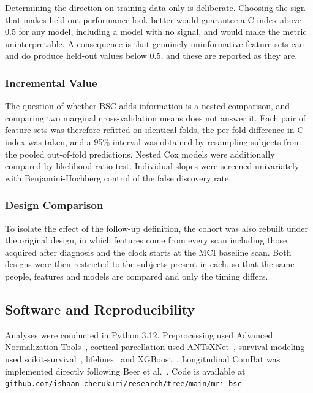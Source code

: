 \documentclass[blue]{ludusofficial}  %
\begin{document}
Determining the direction on training data only is deliberate. Choosing the sign that makes held-out performance look better would guarantee a C-index above 0.5 for any model, including a model with no signal, and would make the metric uninterpretable. A consequence is that genuinely uninformative feature sets can and do produce held-out values below 0.5, and these are reported as they are.

\subsubsection{Incremental Value}

The question of whether BSC adds information is a nested comparison, and comparing two marginal cross-validation means does not answer it. Each pair of feature sets was therefore refitted on identical folds, the per-fold difference in C-index was taken, and a 95\% interval was obtained by resampling subjects from the pooled out-of-fold predictions. Nested Cox models were additionally compared by likelihood ratio test. Individual slopes were screened univariately with Benjamini-Hochberg control of the false discovery rate.

\subsubsection{Design Comparison}

To isolate the effect of the follow-up definition, the cohort was also rebuilt under the original design, in which features come from every scan including those acquired after diagnosis and the clock starts at the MCI baseline scan. Both designs were then restricted to the subjects present in each, so that the same people, features and models are compared and only the timing differs.

\subsection{Software and Reproducibility}

Analyses were conducted in Python 3.12. Preprocessing used Advanced Normalization Tools~\cite{avants2011ants}, cortical parcellation used ANTsXNet~\cite{tustison2021antsxnet}, survival modeling used scikit-survival~\cite{polsterl2020sksurv}, lifelines~\cite{davidson-pilon2019lifelines} and XGBoost~\cite{chen2016xgboost}. Longitudinal ComBat was implemented directly following Beer et al.~\cite{beer2020longitudinal}. Code is available at \texttt{github.com/ishaan-cherukuri/research/tree/main/mri-bsc}.
\end{document}
